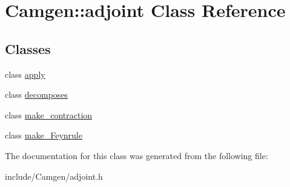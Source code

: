 \hypertarget{a00002}{}\section{Camgen\+:\+:adjoint Class Reference}
\label{a00002}
\subsection*{Classes}
\begin{DoxyCompactItemize}
\item 
class \hyperlink{a00011}{apply}
\item 
class \hyperlink{a00123}{decomposes}
\item 
class \hyperlink{a00341}{make\+\_\+contraction}
\item 
class \hyperlink{a00344}{make\+\_\+\+Feynrule}
\end{DoxyCompactItemize}


The documentation for this class was generated from the following file\+:\begin{DoxyCompactItemize}
\item 
include/\+Camgen/adjoint.\+h\end{DoxyCompactItemize}
